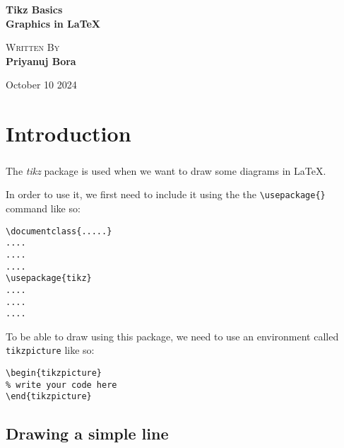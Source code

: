 \documentclass{book}
\newcommand{\bold}[1]{\textbf{#1}}
\begin{document}
	\begin{titlepage}
		\begin{center}
			\Huge\bold{Tikz Basics}\\
			\huge\bold{Graphics in \LaTeX}
			
			\vfill
			
			\Large\textsc{Written By}\\
			\Large\bold{Priyanuj Bora}
			
			\vfill
			
			October 10 2024
		\end{center}
	\end{titlepage}
	
	\tableofcontents
	
	\chapter{Introduction}
	\label{ch:ch1}
	\setcounter{page}{1}
	\fancyhead[L]{\leftmark}
	\fancyhead[R]{\rightmark}
	\fancyfoot[C]{}
	\paragraph{}
	
	The \emph{tikz} package is used when we want to draw some diagrams in \LaTeX.
	
	In order to use it, we first need to include it using the the \lstinline|\usepackage{}| command like so:
	
\begin{lstlisting}[frame=tlBR]
\documentclass{.....}
....
....
....
\usepackage{tikz}
....
....
....
\end{lstlisting}
	
	To be able to draw using this package, we need to use an environment called \lstinline|tikzpicture| like so:
	
\begin{lstlisting}[frame=tlBR]
\begin{tikzpicture}
% write your code here
\end{tikzpicture}
\end{lstlisting}

\section{Drawing a simple line}
\label{sec:sec1}
\paragraph{}
\end{document}
